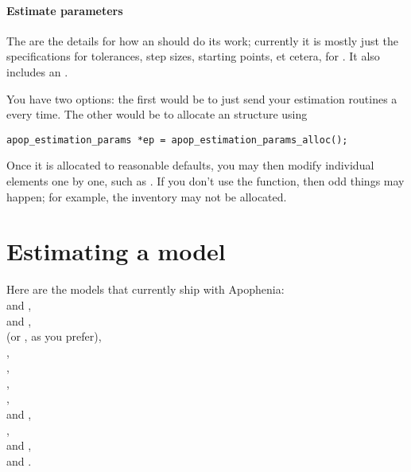 \paragraph{Estimate parameters}
The  are the details for how an  should do its work; currently it is mostly just the specifications
for tolerances, step sizes, starting points, et cetera, for . It also includes an .  

You have two options: the first would be to just send your estimation
routines a  every time. The other would be to allocate an
 structure using 
\begin{lstlisting}
apop_estimation_params *ep = apop_estimation_params_alloc();
\end{lstlisting}
Once it is allocated to reasonable defaults, you may then modify
individual elements one by one, such as .
If you don't use the  function,
then odd things may happen; for example, the inventory may not be
allocated.

\section{Estimating a model}
 
 
 
  
 
\label{modellist}
Here are the models that currently ship with Apophenia:\\
 and , \\
 and , \\
 (or , as you prefer), \\
, \\
, \\
, \\
, \\
 and , \\
, \\
 and , \\
 and .

